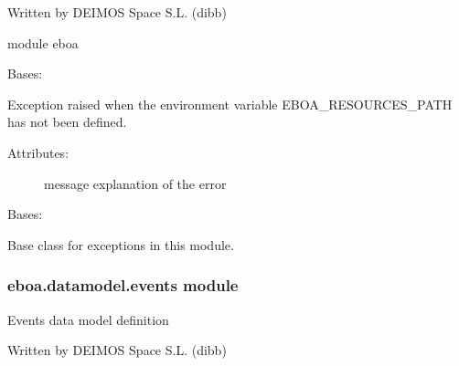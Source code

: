 Written by DEIMOS Space S.L. (dibb)

module eboa

\begin{fulllineitems}
\label{\detokenize{eboa.datamodel:eboa.datamodel.errors.EboaResourcesPathNotAvailable}}
Bases: {\hyperref[\detokenize{eboa.datamodel:eboa.datamodel.errors.Error}]{}}

Exception raised when the environment variable EBOA\_RESOURCES\_PATH has not been defined.
\begin{description}
\item[{Attributes:}] \leavevmode
message \textendash{} explanation of the error

\end{description}

\end{fulllineitems}


\begin{fulllineitems}
\label{\detokenize{eboa.datamodel:eboa.datamodel.errors.Error}}
Bases: 

Base class for exceptions in this module.

\end{fulllineitems}



\subsubsection{eboa.datamodel.events module}
\label{\detokenize{eboa.datamodel:module-eboa.datamodel.events}}\label{\detokenize{eboa.datamodel:eboa-datamodel-events-module}}
Events data model definition

Written by DEIMOS Space S.L. (dibb)

